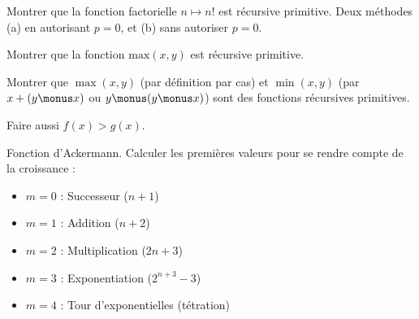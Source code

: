 \documentclass[11pt,class=report,crop=false]{standalone}
\begin{document}

\begin{exercicecours}
    Montrer que la fonction factorielle $n \mapsto n!$ est récursive primitive.
    Deux méthodes (a) en autorisant $p=0$, et (b) sans autoriser $p=0$.
\end{exercicecours}

\begin{exercicecours}
    Montrer que la fonction $\text{max}(x,y)$ est récursive primitive.
\end{exercicecours}

\begin{exercicecours}
   Montrer que $\max(x,y)$ (par définition par cas) et $\min(x,y)$ (par $x + (y \monus x)$ ou $y \monus (y \monus x)$) sont des fonctions récursives primitives.

Faire aussi $f(x) > g(x)$.
\end{exercicecours}

\begin{exercicecours}
Fonction d'Ackermann.
Calculer les premières valeurs pour se rendre compte de la croissance :
\begin{itemize}
    \item $m=0$ : Successeur ($n+1$)
    \item $m=1$ : Addition ($n+2$)
    \item $m=2$ : Multiplication ($2n+3$)
    \item $m=3$ : Exponentiation ($2^{n+3}-3$)
    \item $m=4$ : Tour d'exponentielles (tétration)
\end{itemize}
\end{exercicecours}  

\end{document}
